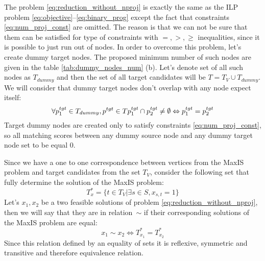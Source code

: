 The problem \eqref{eq:reduction_without_nproj} is exactly the same as the ILP problem \eqref{eq:objective}--\eqref{eq:binary_prog}
except the fact that constraints \eqref{eq:num_proj_const} are omitted. The reason is that we can not be sure
that them can be satisfied for type of constraints with \( =, >, \geq \) inequalities, since it is possible to just run out of nodes.
In order to overcome this problem, let's create dummy target nodes. The proposed minimum number of such nodes are given
in the table \ref{tab:dummy_nodes_num} (b). Let's denote set of all such nodes as \( T_{dummy} \) and then the set of all target candidates
will be \( T = T_V \cup T_{dummy} \). We will consider that dummy target nodes don't overlap with any node expect itself:
\[
    \forall p_1^{tgt} \in T_{dummy}, p^{tgt} \in T
    p_1^{tgt} \cap p_2^{tgt} \neq \emptyset \Leftrightarrow p_1^{tgt} = p_2^{tgt}
\]
Target dummy nodes are created only to satisfy constraints \eqref{eq:num_proj_const}, so all matching scores
between any dummy source node and any dummy target node set to be equal \( 0 \).

Since we have a one to one correspondence between vertices from the MaxIS problem and target
candidates from the set \( T_V \), consider the following set that fully determine the solution of the
MaxIS problem:
\[
    T^*_{x} = \{ t \in T_V | \exists s \in S, x_{s, t} = 1 \}
\]
Let's \( x_1, x_2 \) be a two feasible solutions of problem \eqref{eq:reduction_without_nproj}, then we will say that
they are in relation~\( \sim \) if their corresponding solutions of the MaxIS problem are equal:
\[
    x_1 \sim x_2 \Leftrightarrow T^{*}_{x_1} = T^{*}_{x_2}
\]
Since this relation defined by an equality of sets it is reflexive, symmetric and transitive and therefore
equivalence relation.

